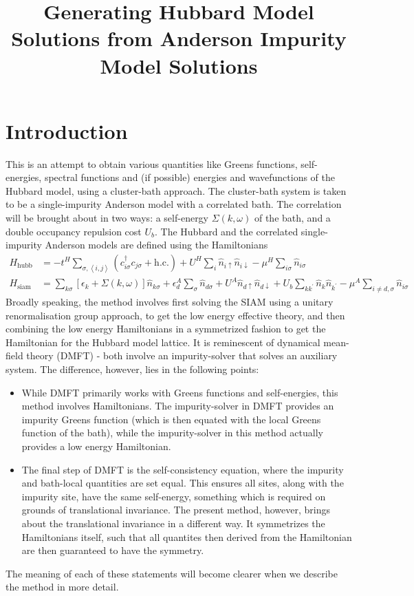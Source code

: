 \documentclass[12pt]{article}
\title{Generating Hubbard Model Solutions from Anderson Impurity Model Solutions}
\author{}%
\numberwithin{equation}{section}
\begin{document}
\maketitle
\section{Introduction}
This is an attempt to obtain various quantities like Greens functions, self-energies, spectral functions and (if possible) energies and wavefunctions of the Hubbard model, using a cluster-bath approach. The cluster-bath system is taken to be a single-impurity Anderson model with a correlated bath. The correlation will be brought about in two ways: a self-energy $\Sigma(k,\omega)$ of the bath, and a double occupancy repulsion cost $U_b$. The Hubbard and the correlated single-impurity Anderson models are defined using the Hamiltonians
\begin{align}
H_\text{hubb} &= -t^H\sum_{\sigma,\left<i,j \right>}\left(c^\dagger_{i\sigma} c_{j\sigma} + \text{h.c.}\right) + U^H\sum_i \hat n_{i \uparrow} \hat n_{i \downarrow} - \mu^H \sum_{i\sigma}\hat n_{i\sigma}\\
H_\text{siam} &= \sum_{k\sigma}\left[\epsilon_k + \Sigma(k,\omega)\right]\hat n_{k\sigma} + \epsilon_d^A \sum_\sigma\hat n_{d\sigma} + U^A \hat n_{d \uparrow} \hat n_{d \downarrow} + U_b \sum_{kk^\prime}\hat n_k \hat n_{k^\prime} - \mu^A \sum_{i\neq d,\sigma}\hat n_{i\sigma} 
	\label{hams}
\end{align}
Broadly speaking, the method involves first solving the SIAM using a unitary renormalisation group approach, to get the low energy effective theory, and then combining the low energy Hamiltonians in a symmetrized fashion to get the Hamiltonian for the Hubbard model lattice. It is reminescent of dynamical mean-field theory (DMFT) - both involve an impurity-solver that solves an auxiliary system. The difference, however, lies in the following points:
\begin{itemize}
	\item While DMFT primarily works with Greens functions and self-energies, this method involves Hamiltonians. The impurity-solver in DMFT provides an impurity Greens function (which is then equated with the local Greens function of the bath), while the impurity-solver in this method actually provides a low energy Hamiltonian.
	\item The final step of DMFT is the self-consistency equation, where the impurity and bath-local quantities are set equal. This ensures all sites, along with the impurity site, have the same self-energy, something which is required on grounds of  translational invariance. The present method, however, brings about the translational invariance in a different way. It symmetrizes the Hamiltonians itself, such that all quantites then derived from the Hamiltonian are then guaranteed to have the symmetry.
\end{itemize}
The meaning of each of these statements will become clearer when we describe the method in more detail.
\end{document}
